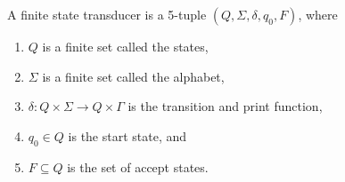 \begin{enumerate}
          A finite state transducer is a 5-tuple $(Q, \Sigma, \delta, q_0,F )$, where 
          \begin{enumerate}
            \item $Q$ is a finite set called the states, 
            \item $\Sigma$ is a finite set called the alphabet, 
            \item $\delta: Q \times \Sigma \longrightarrow Q \times \Gamma$ is the transition and print function,
            \item $q_0 \in Q$ is the start state, and 
            \item $F \subseteq Q$ is the set of accept states.
          \end{enumerate}
\end{enumerate}
